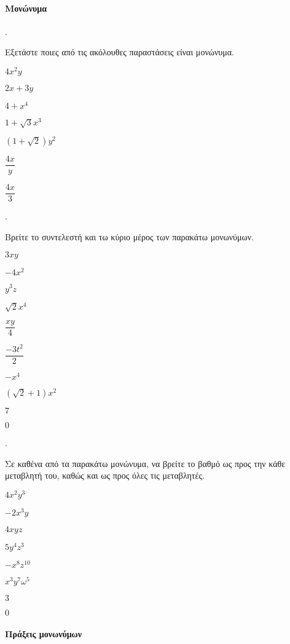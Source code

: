 \documentclass[11pt,a4paper,twocolumn]{article}
\newcounter{askhsh}
\newcommand{\askhsh}{\large\theaskhsh.\ \addtocounter{askhsh}{1}}
\begin{document}
\paragraph{Μονώνυμα}
\askhsh Εξετάστε ποιες από τις ακόλουθες παραστάσεις είναι μονώνυμα.
\begin{multicols}{2}
\begin{alist}
\item $4x^2y$
\item $2x+3y$
\item $4+x^4$
\item $1+\sqrt{3}x^3$
\item $\left(1+\sqrt{2}\right)y^2$
\item $\dfrac{4x}{y}$
\item $\dfrac{4x}{3}$
\end{alist}
\end{multicols}
\askhsh Βρείτε το συντελεστή και τω κύριο μέρος των παρακάτω μονωνύμων.
\begin{multicols}{2}
\begin{alist}
\item $3xy$
\item $-4x^2$
\item $y^3z$
\item $\sqrt{2}x^4$
\item $\dfrac{xy}{4}$
\item $\dfrac{-3t^2}{2}$
\item $-x^4$
\item $\left(\sqrt{2}+1\right)x^2$
\item $7$
\item $0$
\end{alist}
\end{multicols}
\askhsh Σε καθένα από τα παρακάτω μονώνυμα, να βρείτε το βαθμό ως προς την κάθε μεταβλητή του, καθώς και ως προς όλες τις μεταβλητές.
\begin{multicols}{2}
\begin{alist}
\item $4x^2y^3$
\item $-2x^3y$
\item $4xyz$
\item $5y^4z^3$
\item $-x^8z^{10}$
\item $x^3y^7\omega^5$
\item $3$
\item $0$
\end{alist}
\end{multicols}
\paragraph{Πράξεις μονωνύμων}
\end{document}
